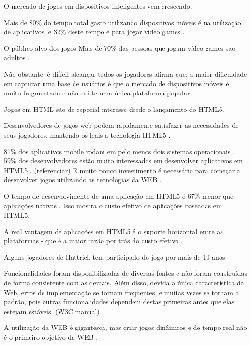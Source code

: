
O mercado de jogos em dispositivos inteligentes vem crescendo.


Mais de 80\% do tempo total gasto utilizando dispositivos móveis é na
utilização de aplicativos, e 32\% deste tempo é para jogar vídeo
games \autocite{HTML5CrossPlatformGameDevelopment}.

O público alvo dos jogos 
Mais de 70\% das pessoas que jogam vídeo games são adultos
\autocite{gamebenefits}.

Não obstante, é difícil alcançar todos os jogadores
\cite{html5Tradeoffs} afirma que: a maior dificuldade em capturar uma
base de usuários é que o mercado de dispositivos móveis é muito
fragmentado e não existe uma única plataforma popular.

Jogos em HTML são de especial interesse desde o lançamento do HTML5.

Desenvolvedores de jogos web podem rapidamente satisfazer as
necessidades de seus jogadores, mantendo-os leais a tecnologia HTML5
\autocite{developingEffect}.

81\% dos aplicativos mobile rodam em pelo menos dois sistemas operacionais \autocite{htmlSurvey}.
59\% dos desenvolvedores estão muito interessados em desenvolver 
aplicativos  em HTML5 \autocite{htmlSurvey}.
(referenciar) E muito pouco investimento é necessário para
começar a desenvolver jogos utilizando as tecnologias da WEB
\autocite{html5mostwanted}.

O tempo de desenvolvimento de uma aplicação em HTML5 é 67\% menor que
aplicações nativas \autocite[pp. 460]{html5Tradeoffs}. Isso mostra o
custo efetivo de aplicações baseadas em HTML5.

A real vantagem de aplicações em HTML5 é o suporte horizontal entre
as plataformas - que é a maior razão por trás do custo efetivo
\autocite{html5Tradeoffs}.

Alguns jogadores de Hattrick tem participado do jogo por mais de 
10 anos \autocite{gameCommunities}

Funcionalidades foram disponibilizadas de diversas fontes e não foram
construídas de forma consistente com as demais. Além disso,
devida a única característica da Web, erros de implementação se
tornam frequentes, e muitas vezes se tornam o padrão, pois outras
funcionalidades dependem destas primeiras antes que elas estejam
estáveis. (W3C manual)

A utilização da WEB é gigantesca, mas criar jogos
dinâmicos e de tempo real não é o primeiro objetivo da WEB
\autocite{html5mostwanted}.

